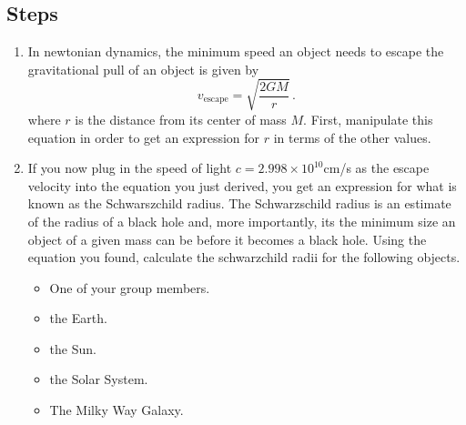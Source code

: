 \subsection{Steps}
\begin{enumerate}
	\item In newtonian dynamics, the minimum speed an object needs to escape the gravitational pull of an object is given by 
	\begin{equation}\label{gc:eq:escape-speed}
		v_\textrm{escape} = \sqrt{\frac{2 G M}{r}} \,.
	\end{equation}
	where $r$ is the distance from its center of mass $M$. First, manipulate this equation in order to get an expression for $r$ in terms of the other values.
	
	\item If you now plug in the speed of light $c = 2.998 \times 10^{10}$cm/s as the escape velocity into the equation you just derived, you get an expression for what is known as the Schwarszchild radius. The Schwarzschild radius is an estimate of the radius of a black hole and, more importantly, its the minimum size an object of a given mass can be before it becomes a black hole. Using the equation you found, calculate the schwarzchild radii for the following objects.
	\begin{itemize}
		\item One of your group members.
		\item the Earth.
		\item the Sun.
		\item the Solar System.
		\item The Milky Way Galaxy.
	\end{itemize}
\end{enumerate}

